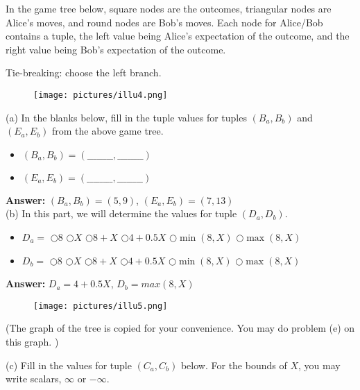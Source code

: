 \documentclass{article}
\begin{document}
\noindent In the game tree below, square nodes are the outcomes, triangular nodes are Alice’s moves, and round nodes are Bob’s moves. Each node for Alice/Bob contains a tuple, the left value being Alice’s expectation of the outcome, and the right value being Bob’s expectation of the outcome.

\noindent Tie-breaking: choose the left branch. 
\begin{figure}[h]
\centering
\texttt{[image: pictures/illu4.png]}
\end{figure}



\noindent (a) In the blanks below, fill in the tuple values for tuples $(B_a , B_b)$ and $(E_a , E_b)$ from the above game tree. \\

\begin{itemize}
  \item $(B_a , B_b) = (\_\_\_\_\_\_\_\_,\_\_\_\_\_\_\_\_)$
  \item $(E_a , E_b) = (\_\_\_\_\_\_\_\_,\_\_\_\_\_\_\_\_)$
\end{itemize}

\textbf{Answer:} $(B_a, B_b) = (5, 9)$, $(E_a, E_b) = (7, 13)$ \\

\noindent (b) In this part, we will determine the values for tuple $(D_a , D_b)$. 
\begin{itemize}
  \item $D_a = $  $\bigcirc 8$  \quad      $\bigcirc X$ \quad     $\bigcirc 8+X$   \quad    $\bigcirc 4+0.5X$   \quad   $\bigcirc \min(8,X)$   \quad   $\bigcirc \max(8,X)$    
  \item $D_b = $  $\bigcirc 8$  \quad      $\bigcirc X$ \quad     $\bigcirc 8+X$   \quad    $\bigcirc 4+0.5X$   \quad   $\bigcirc \min(8,X)$   \quad   $\bigcirc \max(8,X)$   
\end{itemize}

\textbf{Answer:} $D_a = 4+0.5X$, $D_b = max(8, X)$

\newpage
\begin{figure}[h]
\centering
\texttt{[image: pictures/illu5.png]}
\end{figure}
\noindent (The graph of the tree is copied for your convenience. You may do problem (e) on this graph. )

\noindent (c) Fill in the values for tuple $(C_a , C_b)$ below. For the bounds of $X$, you may write scalars, $\infty$ or $-\infty$.
\end{document}
